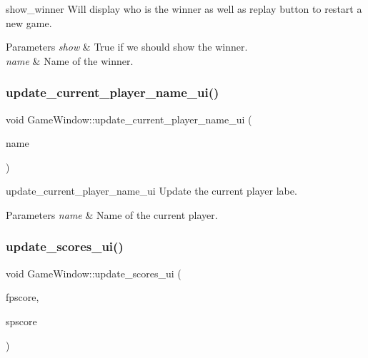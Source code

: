 show\+\_\+winner Will display who is the winner as well as replay button to restart a new game. 


\begin{DoxyParams}{Parameters}
{\em show} & True if we should show the winner. \\
\hline
{\em name} & Name of the winner. \\
\hline
\end{DoxyParams}
\mbox{\label{class_game_window_a97c9a250fd9010a1ee4b39fef5325af7}} 
\subsubsection{\texorpdfstring{update\+\_\+current\+\_\+player\+\_\+name\+\_\+ui()}{update\_current\_player\_name\_ui()}}
{\footnotesize\ttfamily void Game\+Window\+::update\+\_\+current\+\_\+player\+\_\+name\+\_\+ui (\begin{DoxyParamCaption}\item[{Q\+String}]{name }\end{DoxyParamCaption})}



update\+\_\+current\+\_\+player\+\_\+name\+\_\+ui Update the current player labe. 


\begin{DoxyParams}{Parameters}
{\em name} & Name of the current player. \\
\hline
\end{DoxyParams}
\mbox{\label{class_game_window_a6cb8a429ac545c93457ad00bd0242af3}} 
\subsubsection{\texorpdfstring{update\+\_\+scores\+\_\+ui()}{update\_scores\_ui()}}
{\footnotesize\ttfamily void Game\+Window\+::update\+\_\+scores\+\_\+ui (\begin{DoxyParamCaption}\item[{Q\+String}]{fpscore,  }\item[{Q\+String}]{spscore }\end{DoxyParamCaption})}



